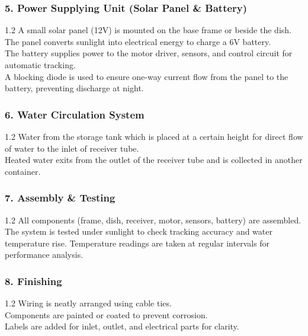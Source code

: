\subsubsection*{5. Power Supplying Unit (Solar Panel \& Battery)}
\noindent
\begin{spacing}{1.2}
{\fontsize{10.2}{14.5}\selectfont
A small solar panel (12V) is mounted on the base frame or beside the dish.\\[2.5mm]
The panel converts sunlight into electrical energy to charge a 6V battery.\\[2.5mm]
The battery supplies power to the motor driver, sensors, and control circuit for automatic tracking.\\[2.5mm]
A blocking diode is used to ensure one-way current flow from the panel to the battery, preventing discharge at night.
}
\end{spacing}

\vspace{4mm}
\subsubsection*{6. Water Circulation System}
\noindent
\begin{spacing}{1.2}
{\fontsize{10.2}{14.5}\selectfont
Water from the storage tank which is placed at a certain height for direct flow of water to the inlet of receiver tube.\\[2.5mm]
Heated water exits from the outlet of the receiver tube and is collected in another container.
}
\end{spacing}

\vspace{4mm}
\subsubsection*{7. Assembly \& Testing}
\noindent
\begin{spacing}{1.2}
{\fontsize{10.2}{14.5}\selectfont
All components (frame, dish, receiver, motor, sensors, battery) are assembled.\\[2.5mm]
The system is tested under sunlight to check tracking accuracy and water temperature rise. Temperature readings are taken at regular intervals for performance analysis.
}
\end{spacing}

\vspace{4mm}
\subsubsection*{8. Finishing}
\noindent
\begin{spacing}{1.2}
{\fontsize{10.2}{14.5}\selectfont
Wiring is neatly arranged using cable ties.\\[2.5mm]
Components are painted or coated to prevent corrosion.\\[2.5mm]
Labels are added for inlet, outlet, and electrical parts for clarity.
}
\end{spacing}
\clearpage
